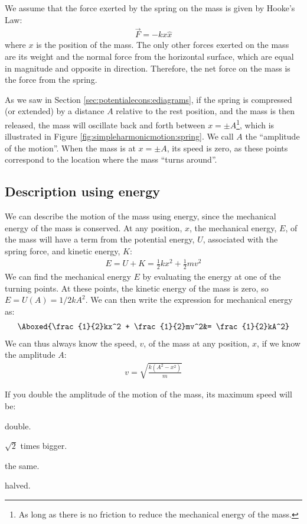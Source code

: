 We assume that the force exerted by the spring on the mass is given by Hooke's Law:
\begin{align*}
\vec F = -kx \hat x
\end{align*}
where $x$ is the position of the mass. The only other forces exerted on the mass are its weight and the normal force from the horizontal surface, which are equal in magnitude and opposite in direction. Therefore, the net force on the mass is the force from the spring. 

As we saw in Section \ref{sec:potentialecons:ediagrams}, if the spring is compressed  (or extended) by a distance $A$ relative to the rest position, and the mass is then released, the mass will oscillate back and forth between $x=\pm A$\footnote{As long as there is no friction to reduce the mechanical energy of the mass.}, which is illustrated in Figure \ref{fig:simpleharmonicmotion:spring}. We call $A$ the ``amplitude of the motion''. When the mass is at $x=\pm A$, its speed is zero, as these points correspond to the location where the mass ``turns around''.

\subsection{Description using energy}
We can describe the motion of the mass using energy, since the mechanical energy of the mass is conserved. At any position, $x$, the mechanical energy, $E$, of the mass will have a term from the potential energy, $U$, associated with the spring force, and kinetic energy, $K$:
\begin{align*}
E = U + K =\frac{1}{2}kx^2 + \frac{1}{2}mv^2
\end{align*}
We can find the mechanical energy $E$ by evaluating the energy at one of the turning points. At these points, the  kinetic energy of the mass is zero, so $E=U(A)=1/2kA^2$. We can then write the expression for mechanical energy as:
\begin{align}
\Aboxed{\frac{1}{2}kx^2 + \frac{1}{2}mv^2&= \frac{1}{2}kA^2}
\end{align}
We can thus always know the speed, $v$, of the mass at any position, $x$, if we know the amplitude $A$:
\begin{align*}
v = \sqrt{\frac{k(A^2-x^2)}{m}}
\end{align*}

\begin{checkpoint}
\begin{MCquestion}{If you double the amplitude of the motion of the mass, its maximum speed will be:}
\item double.
\item $\sqrt 2$ times bigger. \correct
\item the same.
\item halved.
\end{MCquestion}
\end{checkpoint}

